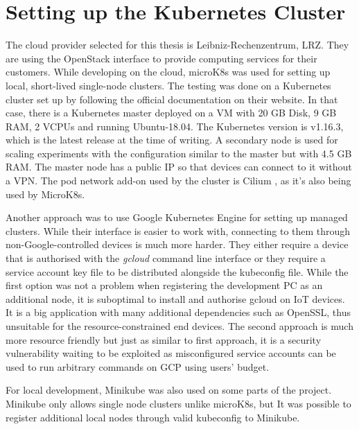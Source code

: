 \section{Setting up the Kubernetes Cluster}
The cloud provider selected for this thesis is Leibniz-Rechenzentrum, LRZ. They are using the OpenStack \cite{openstack} interface to provide computing services for their customers. While developing on the cloud, microK8s was used for setting up local, short-lived single-node clusters. The testing was done on a Kubernetes cluster set up by following the official documentation on their website. In that case, there is a Kubernetes master deployed on a VM with 20 GB Disk, 9 GB RAM, 2 VCPUs and running Ubuntu-18.04. The Kubernetes version is v1.16.3, which is the latest release at the time of writing. A secondary node is used for scaling experiments with the configuration similar to the master but with 4.5 GB RAM. The master node has a public IP so that devices can connect to it without a VPN. The pod network add-on used by the cluster is Cilium \cite{cilium}, as it's also being used by MicroK8s.

Another approach was to use Google Kubernetes Engine for setting up managed clusters. While their interface is easier to work with, connecting to them through non-Google-controlled devices is much more harder. They either require a device that is authorised with the \textit{gcloud} command line interface or they require a service account key file to be distributed alongside the kubeconfig file. While the first option was not a problem when registering the development PC as an additional node, it is suboptimal to install and authorise gcloud on IoT devices. It is a big application with many additional dependencies such as OpenSSL, thus unsuitable for the resource-constrained end devices. The second approach is much more resource friendly but just as similar to first approach, it is a security vulnerability waiting to be exploited as misconfigured service accounts can be used to run arbitrary commands on GCP using users' budget.

For local development, Minikube was also used on some parts of the project. Minikube only allows single node clusters unlike microK8s, but It was possible to register additional local nodes through valid kubeconfig to Minikube.
